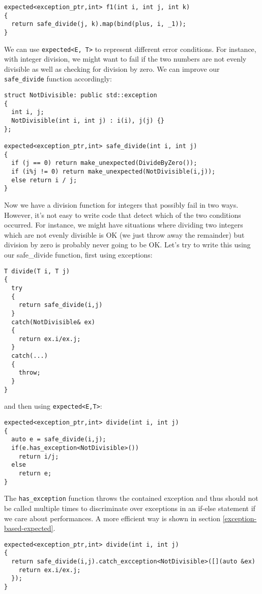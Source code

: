 \documentclass[a4paper,10pt]{article}
\newcommand{\cpp}[1]{\lstinline{#1}}
\begin{document}
\begin{lstlisting}
expected<exception_ptr,int> f1(int i, int j, int k)
{
  return safe_divide(j, k).map(bind(plus, i, _1));
}
\end{lstlisting}

We can use \cpp{expected<E, T>} to represent different error conditions. For instance, with integer division, we might want to fail if the two numbers are not evenly divisible as well as checking for division by zero. We can improve our \cpp{safe_divide} function accordingly:

\begin{lstlisting}
struct NotDivisible: public std::exception
{
  int i, j;
  NotDivisible(int i, int j) : i(i), j(j) {}
};

expected<exception_ptr,int> safe_divide(int i, int j)
{
  if (j == 0) return make_unexpected(DivideByZero()); 
  if (i%j != 0) return make_unexpected(NotDivisible(i,j));
  else return i / j; 
}
\end{lstlisting}

Now we have a division function for integers that possibly fail in two ways. However, it's not easy to write code that detect which of the two conditions occurred. For instance, we might have situations where dividing two integers which are not evenly divisible is OK (we just throw away the remainder) but division by zero is probably never going to be OK. Let's try to write this using our safe_divide function, first using exceptions:

\begin{lstlisting}
T divide(T i, T j)
{
  try
  {
    return safe_divide(i,j)
  }
  catch(NotDivisible& ex)
  {
    return ex.i/ex.j;
  }
  catch(...)
  {
    throw;
  }
}
\end{lstlisting}

\noindent
and then using \cpp{expected<E,T>}:

\begin{lstlisting}
expected<exception_ptr,int> divide(int i, int j)
{
  auto e = safe_divide(i,j);
  if(e.has_exception<NotDivisible>())
    return i/j;
  else 
    return e;
}
\end{lstlisting}

\noindent
The \cpp{has_exception} function throws the contained exception and thus should not be called multiple times to discriminate over exceptions in an if-else statement if we care about performances. A more efficient way is shown in section \ref{exception-based-expected}. 

\begin{lstlisting}
expected<exception_ptr,int> divide(int i, int j)
{
  return safe_divide(i,j).catch_excception<NotDivisible>([](auto &ex)
    return ex.i/ex.j;
  });
}
\end{lstlisting}
\end{document}
